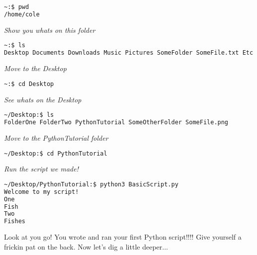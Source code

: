 \documentclass[12pt]{article}
\begin{document}
\begin{lstlisting}[language=sh]
~:$ pwd     
/home/cole
\end{lstlisting}
\textit{Show you whats on this folder}\\
\begin{lstlisting}[language=sh]
~:$ ls      
Desktop Documents Downloads Music Pictures SomeFolder SomeFile.txt Etc.md
\end{lstlisting}
\textit{Move to the Desktop}\\
\begin{lstlisting}[language=sh]
~:$ cd Desktop      
\end{lstlisting}
\textit{See whats on the Desktop}\\
\begin{lstlisting}[language=sh]
~/Desktop:$ ls      
FolderOne FolderTwo PythonTutorial SomeOtherFolder SomeFile.png
\end{lstlisting}
\textit{Move to the PythonTutorial folder}\\
\begin{lstlisting}[language=sh]
~/Desktop:$ cd PythonTutorial      
\end{lstlisting}
\textit{Run the script we made!}\\
\begin{lstlisting}[language=sh]
~/Desktop/PythonTutorial:$ python3 BasicScript.py
Welcome to my script!
One
Fish
Two
Fishes
\end{lstlisting}
Look at you go! You wrote and ran your first Python script!!!! Give yourself a frickin pat on the back. Now let's dig a little deeper...\\

\\
\end{document}
